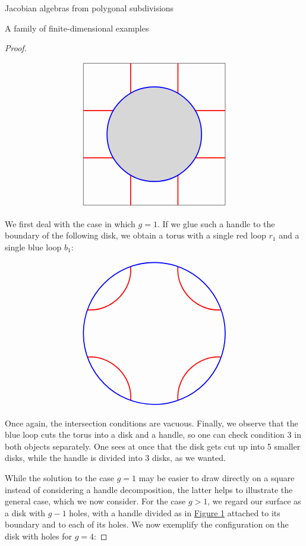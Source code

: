 \begin{chapter}{Jacobian algebras from polygonal subdivisions}
\begin{section}{A family of finite-dimensional examples}
\begin{proof}
\begin{figure}[h]
\[
\begin{tikzpicture}
\draw (0,0) node[minimum size=6cm,draw] {};

\fill [black,opacity=.15] circle (2cm);

\draw[red, very thick] (-3,1) -- (-1.73,1);
\draw[red, very thick] (-3,-1) -- (-1.73,-1);

\draw[red, very thick] (3,1) -- (1.73,1);
\draw[red, very thick] (3,-1) -- (1.73,-1);

\draw[red, very thick] (1,-3) -- (1,-1.73);
\draw[red, very thick] (-1,-3) -- (-1,-1.73);

\draw[red, very thick] (1,3) -- (1,1.73);
\draw[red, very thick] (-1,3) -- (-1,1.73);

\draw[blue, very thick] (0,0) circle (2cm);
\end{tikzpicture}
\]
\caption{}
\label{divided-handle}
\end{figure}

We first deal with the case in which $g=1$. If we glue such a handle to the boundary of the following disk, we obtain a torus with a single red loop $r_1$ and a single blue loop $b_1$:

\begin{figure}[h]
\[
\begin{tikzpicture}

\draw[red, very thick] (-2.83,1) to [bend right=50] (-1,2.83);
\draw[red, very thick] (2.83,1) to [bend left=50] (1,2.83);
\draw[red, very thick] (2.83,-1) to [bend right=50] (1,-2.83);
\draw[red, very thick] (-2.83,-1) to [bend left=50] (-1,-2.83);

\draw[blue, very thick] (0,0) circle (3cm);
\end{tikzpicture}
\]
\end{figure}

Once again, the intersection conditions are vacuous. Finally, we observe that the blue loop cuts the torus into a disk and a handle, so one can check condition $3$ in both objects separately. One sees at once that the disk gets cut up into 5 smaller disks, while the handle is divided into $3$ disks, as we wanted.

While the solution to the case $g=1$ may be easier to draw directly on a square instead of considering a handle decomposition, the latter helps to illustrate the general case, which we now consider. For the case $g>1$, we regard our surface as a disk with $g-1$ holes, with a handle divided as in \hyperref[divided-handle]{Figure \ref*{divided-handle}} attached to its boundary and to each of its holes. We now exemplify the configuration on the disk with holes for $g=4$:


\end{proof}
\end{section}
\end{chapter}
